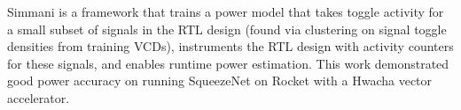 \documentclass[sigconf]{acmart}
\begin{document}

Simmani\cite{simmani} is a framework that trains a power model that takes toggle activity for a small subset of signals in the RTL design (found via clustering on signal toggle densities from training VCDs), instruments the RTL design with activity counters for these signals, and enables runtime power estimation.
This work demonstrated good power accuracy on running SqueezeNet on Rocket with a Hwacha vector accelerator.




\end{document}
